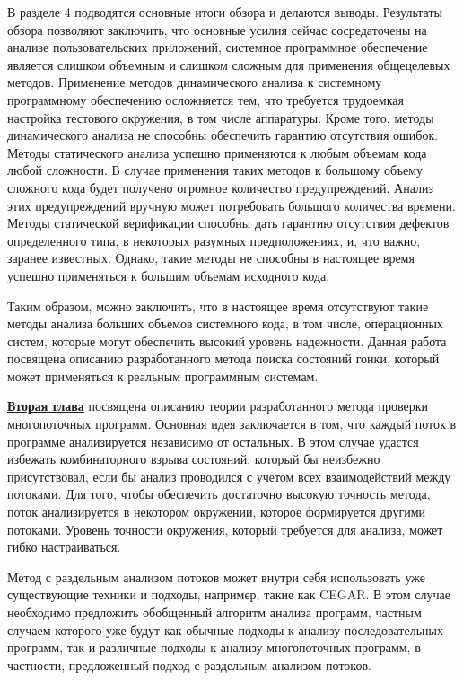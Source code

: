 В разделе 4 подводятся основные итоги обзора и делаются выводы.
Результаты обзора позволяют заключить, что основные усилия сейчас сосредаточены на анализе пользовательских приложений, 
системное программное обеспечение является слишком объемным и слишком сложным для применения общецелевых методов.
Применение методов динамического анализа к системному программному обеспечению осложняется тем, что требуется трудоемкая настройка тестового окружения, в том числе аппаратуры.
Кроме того, методы динамического анализа не способны обеспечить гарантию отсутствия ошибок.
Методы статического анализа успешно применяются к любым объемам кода любой сложности. 
В случае применения таких методов к большому объему сложного кода будет получено огромное количество предупреждений.
Анализ этих предупреждений вручную может потребовать большого количества времени.
Методы статической верификации способны дать гарантию отсутствия дефектов определенного типа, в некоторых разумных предположениях, и, что важно, заранее известных.
Однако, такие методы не способны в настоящее время успешно применяться к большим объемам исходного кода.

Таким образом, можно заключить, что в настоящее время отсутствуют такие методы анализа больших объемов системного кода, в том числе, операционных систем, которые могут обеспечить высокий уровень надежности.
Данная работа посвящена описанию разработанного метода поиска состояний гонки, который может применяться к реальным программным системам.

\underline{\textbf{Вторая глава}} посвящена описанию теории разработанного метода проверки многопоточных программ.
Основная идея заключается в том, что каждый поток в программе анализируется независимо от остальных.
В этом случае удастся избежать комбинаторного взрыва состояний, который бы неизбежно присутствовал, если бы анализ проводился с учетом всех взаимодействий между потоками.
Для того, чтобы обеспечить достаточно высокую точность метода, поток анализируется в некотором окружении, которое формируется другими потоками. 
Уровень точности окружения, который требуется для анализа, может гибко настраиваться.

Метод с раздельным анализом потоков может внутри себя использовать уже существующие техники и подходы, например, такие как CEGAR.
В этом случае необходимо предложить обобщенный алгоритм анализа программ, частным случаем которого уже будут как обычные подходы к анализу последовательных программ, так и различные подходы к анализу многопоточных программ, в частности, предложенный подход с раздельным анализом потоков. 

